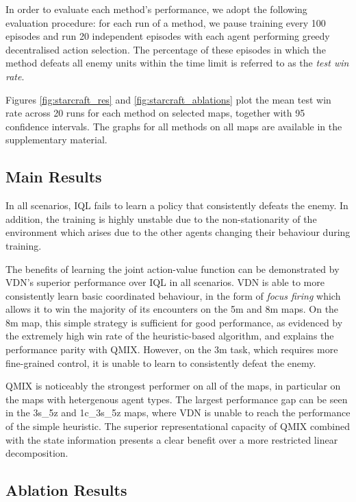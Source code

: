 \documentclass{article}
\begin{document}
In order to evaluate each method's performance, we adopt the following evaluation procedure: for each run of a method, we pause training every 100 episodes and run 20 independent episodes with each agent performing greedy decentralised action selection. The percentage of these episodes in which the method defeats all enemy units within the time limit is referred to as the \emph{test win rate}. 

Figures \ref{fig:starcraft_res} and \ref{fig:starcraft_ablations} plot the mean test win rate across 20 runs for each method on selected maps, together with 95 confidence intervals. The graphs for all methods on all maps are available in the supplementary material.

\subsection{Main Results}
In all scenarios, IQL fails to learn a policy that consistently defeats the enemy. In addition, the training is highly unstable due to the non-stationarity of the environment which arises due to the other agents changing their behaviour during training. 

The benefits of learning the joint action-value function can be demonstrated by VDN's superior performance over IQL in all scenarios. VDN is able to more consistently learn basic coordinated behaviour, in the form of \textit{focus firing} which allows it to win the majority of its encounters on the 5m and 8m maps. On the 8m map, this simple strategy is sufficient for good performance, as evidenced by the extremely high win rate of the heuristic-based algorithm, and explains the performance parity with QMIX. However, on the 3m task, which requires more fine-grained control, it is unable to learn to consistently defeat the enemy.

QMIX is noticeably the strongest performer on all of the maps, in particular on the maps with hetergenous agent types. The largest performance gap can be seen in the 3s\_5z and 1c\_3s\_5z maps, where VDN is unable to reach the performance of the simple heuristic. The superior representational capacity of QMIX combined with the state information presents a clear benefit over a more restricted linear decomposition. 

\subsection{Ablation Results}
\end{document}
